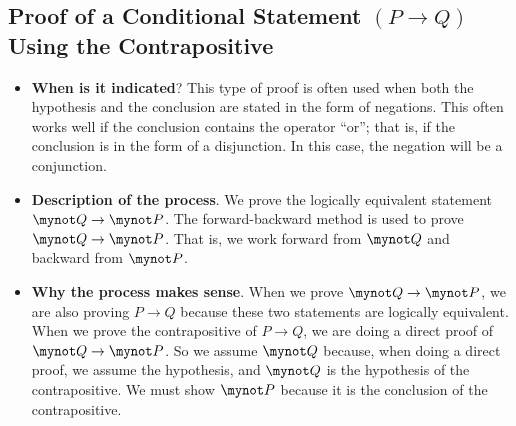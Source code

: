 \subsection*{Proof of a Conditional Statement  $\left( P \to Q \right)$ Using the Contrapositive}
%
%

\begin{itemize}
\item \textbf{When is it indicated}?  This type of proof is often used when both the hypothesis and the conclusion are stated in the form of negations.  This often works well if the conclusion contains the operator ``or'';  that is, if the conclusion is in the form of a disjunction.  In this case, the negation will be a conjunction.

\item \textbf{Description of the process}.  We prove the logically equivalent statement  
$\mynot  Q \to \mynot  P$.  The forward-backward method is used to prove  
$\mynot  Q \to \mynot  P$.  That is, we work forward from   $\mynot  Q$  and backward from  
$\mynot P$.  

\item \textbf{Why the process makes sense}.  When we prove  $\mynot  Q \to \mynot  P$, we are also proving  $P \to Q$  because these two statements are logically equivalent.  When we prove the contrapositive of   $P \to Q$, we are doing a direct proof of  $\mynot  Q \to \mynot P$.  So we assume  $\mynot  Q$  because, when doing a direct proof, we assume the hypothesis, and  $\mynot  Q$  is the hypothesis of the contrapositive.  We must show  $\mynot  P$  because it is the conclusion of the contrapositive.
\end{itemize}

\endinput
